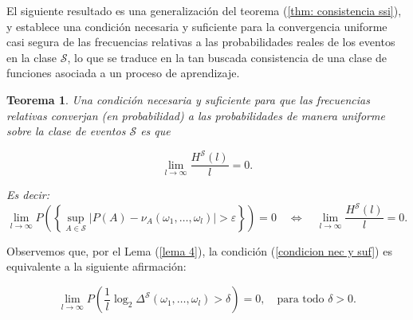 \documentclass{report}
\newtheorem{thm}{Teorema}[section]
\begin{document}
El siguiente resultado es una generalización del teorema (\ref{thm: consistencia ssi}), y establece una condición necesaria y suficiente para la 
convergencia uniforme casi segura de las frecuencias relativas a las probabilidades reales de los eventos en la clase \( \mathcal{S} \), lo que 
se traduce en la tan buscada consistencia de una clase de funciones asociada a un proceso de aprendizaje. \newline


\begin{thm}
    Una condición necesaria y suficiente para que las frecuencias relativas converjan (en probabilidad) a 
    las probabilidades de manera uniforme sobre la clase de eventos \( \mathcal{S} \) es que  
    
    \begin{equation}
    \lim_{l \to \infty} \frac{H^{\mathcal{S}}(l)}{l} = 0. \label{condicion nec y suf}
    \end{equation}

    Es decir:
    \begin{equation*}
       \lim_{l \to \infty} P\left(\left\{ \sup_{A\in\mathcal{S}} |P(A)-\nu_A\left(\omega_1,\ldots, \omega_l\right)| > \varepsilon\right\} \right) = 0
       \quad \Longleftrightarrow \quad
        \lim_{l \to \infty} \frac{H^{\mathcal{S}}(l)}{l} = 0.
    \end{equation*}
\end{thm}
\bigbreak    
    Observemos que, por el Lema (\ref{lema 4}), la condición (\ref{condicion nec y suf}) es equivalente a la siguiente afirmación:  
    
\begin{equation}
    \lim_{l \to \infty} P\left( \frac{1}{l}\log_2 \Delta^{\mathcal{S}}(\omega_1, \dots, \omega_l) > \delta  \right) = 0, 
    \quad \text{para todo } \delta > 0.
\end{equation}
\end{document}
